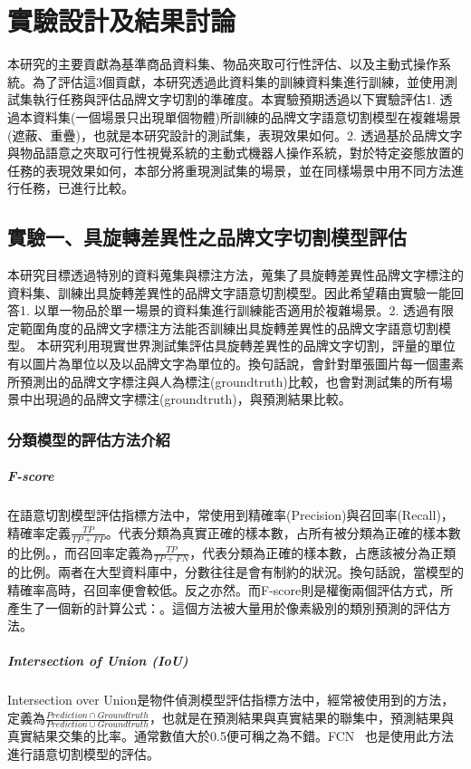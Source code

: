 \chapter{實驗設計及結果討論}
\label{chapter:experiment}

本研究的主要貢獻為基準商品資料集、物品夾取可行性評估、以及主動式操作系統。為了評估這3個貢獻，本研究透過此資料集的訓練資料集進行訓練，並使用測試集執行任務與評估品牌文字切割的準確度。本實驗預期透過以下實驗評估1. 透過本資料集(一個場景只出現單個物體)所訓練的品牌文字語意切割模型在複雜場景(遮蔽、重疊)，也就是本研究設計的測試集，表現效果如何。2. 透過基於品牌文字與物品語意之夾取可行性視覺系統的主動式機器人操作系統，對於特定姿態放置的任務的表現效果如何，本部分將重現測試集的場景，並在同樣場景中用不同方法進行任務，已進行比較。

\section{實驗一、具旋轉差異性之品牌文字切割模型評估}
本研究目標透過特別的資料蒐集與標注方法，蒐集了具旋轉差異性品牌文字標注的資料集、訓練出具旋轉差異性的品牌文字語意切割模型。因此希望藉由實驗一能回答1. 以單一物品於單一場景的資料集進行訓練能否適用於複雜場景。2. 透過有限定範圍角度的品牌文字標注方法能否訓練出具旋轉差異性的品牌文字語意切割模型。
本研究利用現實世界測試集評估具旋轉差異性的品牌文字切割，評量的單位有以圖片為單位以及以品牌文字為單位的。換句話說，會針對單張圖片每一個畫素所預測出的品牌文字標注與人為標注(groundtruth)比較，也會對測試集的所有場景中出現過的品牌文字標注(groundtruth)，與預測結果比較。


\subsection{分類模型的評估方法介紹}

\paragraph{F-score}
在語意切割模型評估指標方法中，常使用到精確率(Precision)與召回率(Recall)，精確率定義$\frac{TP}{TP + FP}$。代表分類為真實正確的樣本數，占所有被分類為正確的樣本數的比例。，而召回率定義為$\frac{TP}{TP + FN}$，代表分類為正確的樣本數，占應該被分為正類的比例。兩者在大型資料庫中，分數往往是會有制約的狀況。換句話說，當模型的精確率高時，召回率便會較低。反之亦然。而F-score則是權衡兩個評估方式，所產生了一個新的計算公式：。這個方法被大量用於像素級別的類別預測的評估方法。

\paragraph{Intersection of Union (IoU)}
Intersection over Union是物件偵測模型評估指標方法中，經常被使用到的方法，定義為$\frac{Prediction \cap  Groundtruth}{Prediction \cup  Groundtruth}$，也就是在預測結果與真實結果的聯集中，預測結果與真實結果交集的比率。通常數值大於0.5便可稱之為不錯。FCN ~\cite{long2015fully}也是使用此方法進行語意切割模型的評估。


